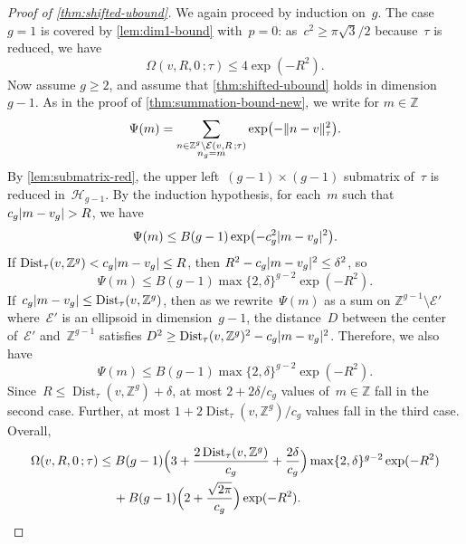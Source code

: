 \documentclass[12pt,oneside]{amsart}
\numberwithin{equation}{section}
\theoremstyle{definition}
\newcommand{\Z}{\mathbb{Z}}
\newcommand{\Half}{\mathcal{H}}
\newcommand{\eld}[3]{\ensuremath{\mathcal{E}(#1, #2\,; #3)}}
\newcommand{\tailsum}[4]{\ensuremath{\Omega(#1,#2,#3\,;#4)}}
\DeclareMathOperator{\Dist}{Dist}
\DeclarePairedDelimiter{\abs}{|}{|}
\DeclarePairedDelimiter{\paren}{(}{)}
\DeclarePairedDelimiter{\norm}{\|}{\|}
\begin{document}
\begin{proof}[Proof of \cref{thm:shifted-ubound}]
  We again proceed by induction on~$g$. The case $g=1$ is covered by
  \cref{lem:dim1-bound} with~$p=0$: as~$c^2\geq \pi\sqrt{3}/2$ because~$\tau$ is
  reduced, we have
  \begin{displaymath}
    \tailsum{v}{R}{0}{\tau} \leq 4 \exp(-R^2).
  \end{displaymath}
  Now assume $g\geq 2$, and assume that \cref{thm:shifted-ubound} holds in
  dimension~$g-1$. As in the proof of \cref{thm:summation-bound-new}, we write
  for $m\in \Z$
  \begin{displaymath}
    \Psi(m) = \sum_{\substack{n\in \Z^g\setminus\eld{v}{R}{\tau}\\n_g = m}} \exp\paren[\big]{- \norm{n-v}_\tau^2}.
  \end{displaymath}
  By \cref{lem:submatrix-red}, the upper left~$(g-1)\times(g-1)$ submatrix
  of~$\tau$ is reduced in~$\Half_{g-1}$.  By the induction
  hypothesis, for each~$m$ such that $c_g\abs{m - v_g} > R$, we have
  \begin{displaymath}
    \Psi(m) \leq B(g-1) \exp\paren[\big]{-c_g^2 \abs{m - v_g}^2}.
  \end{displaymath}
  If $\Dist_\tau(v, \Z^g) < c_g\abs{m - v_g} \leq R$, then
  $R^2 - c_g\abs{m-v_g}^2 \leq \delta^2$, so
  \begin{displaymath}
    \Psi(m) \leq B(g-1) \max\{2, \delta\}^{g-2} \exp(-R^2).
  \end{displaymath}
  If~$c_g\abs{m - v_g} \leq \Dist_\tau(v,\Z^g)$, then as we rewrite~$\Psi(m)$
  as a sum on $\Z^{g-1}\setminus \mathcal{E}'$ where~$\mathcal{E'}$ is an
  ellipsoid in dimension~$g-1$, the distance~$D$ between the center
  of~$\mathcal{E}'$ and~$\Z^{g-1}$ satisfies
  $D^2 \geq \Dist_\tau(v,\Z^g)^2 - c_g\abs{m - v_g}^2$. Therefore, we also have
  \begin{displaymath}
    \Psi(m) \leq B(g-1) \max\{2,\delta\}^{g-2} \exp(-R^2).
  \end{displaymath}
  Since~$R\leq \Dist_\tau(v,\Z^g) + \delta$, at most $2 + 2\delta/c_g$
  values of~$m\in \Z$ fall in the second case. Further, at most
  $1 + 2\Dist_\tau(v,\Z^g)/c_g$ values fall in the third case. Overall,
  \begin{align*}
    \tailsum{v}{R}{0}{\tau} &\leq B(g-1) \paren[\Big]{3 + \frac{2 \Dist_\tau(v,\Z^g)}{c_g}
                              + \frac{2\delta}{c_g}}\max\{2, \delta\}^{g-2}\exp(-R^2) \\
    &\quad\, + B(g-1) \paren[\Big]{2 + \frac{\sqrt{2\pi}}{c_g}} \exp(-R^2).

\end{align*}
\end{proof}
\end{document}
